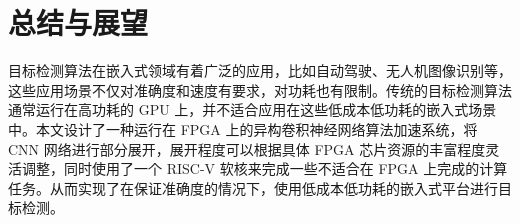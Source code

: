\chapter{总结与展望}\label{chap:summary}










目标检测算法在嵌入式领域有着广泛的应用，比如自动驾驶、无人机图像识别等，这些应用场景不仅对准确度和速度有要求，对功耗也有限制。传统的目标检测算法通常运行在高功耗的 GPU 上，并不适合应用在这些低成本低功耗的嵌入式场景中。本文设计了一种运行在 FPGA 上的异构卷积神经网络算法加速系统，将 CNN 网络进行部分展开，展开程度可以根据具体 FPGA 芯片资源的丰富程度灵活调整，同时使用了一个 RISC-V 软核来完成一些不适合在 FPGA 上完成的计算任务。从而实现了在保证准确度的情况下，使用低成本低功耗的嵌入式平台进行目标检测。

